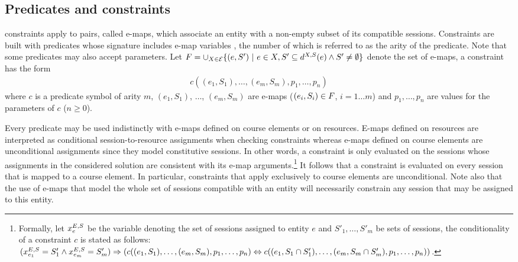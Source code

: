 \subsection{Predicates and constraints}
\label{sec:constraints}
{\UTP} constraints apply to pairs, called e-maps, which associate an entity with a non-empty subset of its compatible sessions.
Constraints are built with predicates whose signature includes e-map variables%
, the number of which is referred to as the arity of the predicate. 
Note that some predicates may also accept parameters.
Let 
${F}=
\cup_{X \in \mathcal{E}}\{(e,S')\ |\ e\in X,S'\subseteq d^{X,S}(e)\wedge S'\neq\emptyset\}$
denote the set of e-maps,
a {\UTP} constraint has the form
\begin{align}
c((e_1,S_1),\ldots,(e_m,S_m),p_1,\ldots,p_n) \label{rule:constraint}
\end{align}
where 
$c$ is a predicate symbol of arity $m$,
$(e_1,S_1)$, $\ldots$, $(e_m,S_m)$ are e-maps ($(e_i,S_i)\in{F}$, $i=1\ldots m$) 
and 
$p_1,\ldots,p_n$ are values for the parameters of $c$ ($n\geq0$).


Every predicate may be used indistinctly with e-maps defined on course elements or on resources.
E-maps defined on resources are interpreted as conditional session-to-resource assignments
when checking constraints 
whereas e-maps defined on course elements are unconditional assignments since they model constitutive sessions.
In other words, 
a constraint is only evaluated
on the sessions whose assignments in the considered solution are consistent with its e-map arguments.\footnote{Formally, let $x^{E,S}_{e}$ be the variable denoting the set of sessions assigned to entity $e$ and $S'_1,\ldots,S'_m$ be sets of sessions, the conditionality of a constraint $c$ is stated as follows: 
$(x^{E,S}_{e_1}=S'_1 \wedge x^{E,S}_{e_m}=S'_m)
\Rightarrow
(c((e_1,S_1),\ldots,(e_m,S_m),p_1,\ldots,p_n)
\Leftrightarrow
c((e_1,S_1\cap S'_1),\ldots,(e_m,S_m\cap S'_m),p_1,\ldots,p_n))$.
}
It follows that 
a constraint is evaluated on every session that is mapped to a course element.
In particular, constraints that apply exclusively to course elements are unconditional. 
Note also that the use of e-maps that model the whole set of sessions compatible with an entity 
will necessarily constrain any session that may be assigned to this entity.


